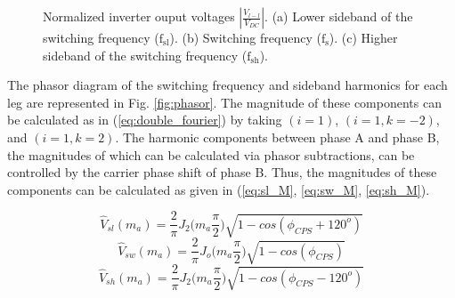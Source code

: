 \documentclass[journal]{IEEEtran}
\begin{document}
\begin{figure}[t!]
\centering
{}
        \caption{Normalized inverter ouput voltages $|\frac{V_{l-l}}{V_{DC}}|$. 
        (a) Lower sideband of the switching frequency ($\mathrm{f_{sl}}$). 
        (b) Switching frequency ($\mathrm{f_{s}}$).
        (c) Higher sideband of the switching frequency ($\mathrm{f_{sh}}$).}
    \label{fig:control_space}
\end{figure}

The phasor diagram of the switching frequency and sideband harmonics for each leg are represented in Fig. \ref{fig:phasor}.
The magnitude of these components can be calculated as in (\ref{eq:double_fourier}) by taking $(i=1)$, $(i=1,k=-2) $, and $(i=1,k=2)$.
The harmonic components between phase A and phase B, the magnitudes of which can be calculated via phasor subtractions, can be controlled by the carrier phase shift of phase B. 
Thus, the magnitudes of these components can be calculated as given in (\ref{eq:sl_M}, \ref{eq:sw_M}, \ref{eq:sh_M}).

\newpage

\begin{equation}
\label{eq:sl_M}
\hat{V}_{sl}(m_a)=\frac{2}{\pi} J_2\bigg(m_a\frac{\pi}{2}\bigg)\sqrt{1-cos(\phi_{CPS}+120^o)}  
\end{equation}
\begin{equation}
\label{eq:sw_M}
\hat{V}_{sw}(m_a)= \frac{2}{\pi} J_o\bigg(m_a \frac{\pi}{2}\bigg)\sqrt{1-cos(\phi_{CPS})}  
\end{equation}
\begin{equation}
\label{eq:sh_M}
\hat{V}_{sh}(m_a)=\frac{2}{\pi} J_2\bigg(m_a\frac{\pi}{2}\bigg)\sqrt{1-cos(\phi_{CPS}-120^o)}  
\end{equation}
\end{document}
